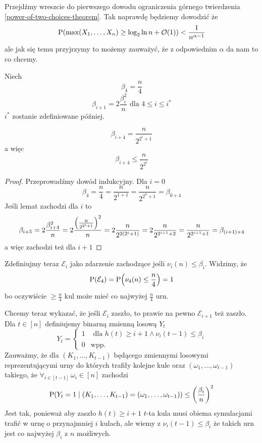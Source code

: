 Przejdźmy wreszcie do pierwszego dowodu ograniczenia górnego twierdzenia \ref{power-of-two-choices-theorem}. Tak naprawdę będziemy dowodzić że
\[
	\prob\pars{\max(X_1, \dots, X_n) \geq \log_2 \ln n + \mathcal{O}(1)} < \frac{1}{n^{\alpha - 1}}
\]
ale jak się temu przyjrzymy to możemy zauważyć, że z odpowiednim \(\alpha\) da nam to co chcemy.

Niech
\[
	\beta_4 = \frac{n}{4}
\]
\[
	\beta_{i+1} = 2\frac{\beta_i^2}{n} \text{ dla } 4 \leq i \leq i^*
\]
\(i^*\) zostanie zdefiniowane później.

\begin{lemma}
	\[
		\beta_{i+4} = \frac{n}{2^{2^i + 1}}
	\]
	a więc
	\[
		\beta_{i+4} \leq \frac{n}{2^{2^i}}
	\]
\end{lemma}
\begin{proof}
	Przeprowadźmy dowód indukcyjny. Dla \(i = 0\)
	\[
		\beta_4 = \frac{n}{4} = \frac{n}{2^{1 + 1}} = \frac{n}{2^{2^0 + 1}} = \beta_{0 + 4}
	\]
	Jeśli lemat zachodzi dla \(i\) to
	\[
		\beta_{i+5} = 2\frac{\beta_{i+4}^2}{n}
		= 2\frac{\left(\frac{n}{2^{2^i + 1}}\right)^2}{n}
		= 2\frac{n}{2^{2(2^i + 1)}}
		= 2\frac{n}{2^{2^{i + 1} + 2}}
		= \frac{n}{2^{2^{i + 1} + 1}}
		= \beta_{(i + 1) + 4}
	\]
	a więc zachodzi też dla \(i + 1\)
\end{proof}

Zdefiniujmy teraz \(\mathcal{E}_i\) jako zdarzenie zachodzące jeśli \(\nu_i(n) \leq \beta_i\). Widzimy, że
\[
	\prob(\mathcal{E}_4) = \prob\pars{\nu_4(n) \leq \frac{n}{4}} = 1
\]
bo oczywiście \(\geq \frac{n}{4}\) kul może mieć co najwyżej \(\frac{n}{4}\) urn.

Chcemy teraz wykazać, że jeśli \(\mathcal{E}_i\) zaszło, to prawie na pewno \(\mathcal{E}_{i + 1}\) też zaszło. Dla \(t \in [n]\) definiujemy binarną zmienną losową \(Y_t\)
\[
	Y_t = \left\{ \begin{array}{lr} 1 & \text{ dla } h(t) \geq i + 1 \land \nu_i(t - 1) \leq \beta_i \\ 0 & \text{wpp.} \end{array} \right.
\]
Zauważmy, że dla \((K_1, \dots, K_{t - 1})\) będącego zmiennymi losowymi reprezentującymi urny do których trafiły kolejne kule oraz \((\omega_1, \dots, \omega_{t - 1})\) takiego, że \(\forall_{i \in [t - 1]} \, \omega_i \in [n]\) zachodzi
\[
	\operatorname{P}(Y_t = 1 \mid (K_1, \dots, K_{t - 1}) = (\omega_1, \dots, \omega_{t - 1})) \leq \left(\frac{\beta_i}{n}\right)^2
\]
Jest tak, ponieważ aby zaszło \(h(t) \geq i + 1\) \(t\)-ta kula musi obiema symulacjami trafić w urnę o przynajmniej \(i\) kulach, ale wiemy z \(\nu_i(t - 1) \leq \beta_i \) że takich urn jest co najwyżej \(\beta_i\) z \(n\) możliwych.

